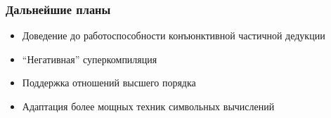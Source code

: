 \documentclass{beamer}
\begin{document}
\begin{frame}[fragile]
  \transwipe[direction=90]
  \frametitle{Дальнейшие планы}
\begin{itemize}
  \item Доведение до работоспособности конъюнктивной частичной дедукции
  \item ``Негативная'' суперкомпиляция
  \item Поддержка отношений высшего порядка
  \item Адаптация более мощных техник символьных вычислений
\end{itemize}
\end{frame}
\end{document}
